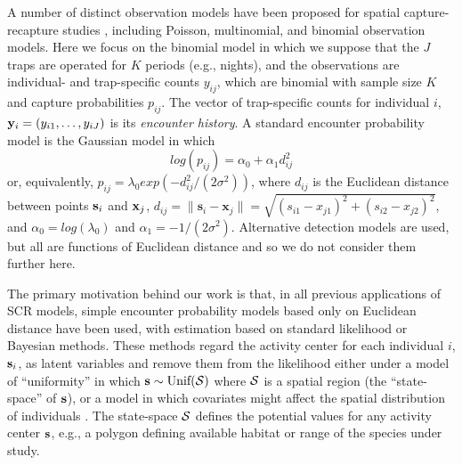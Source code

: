 \documentclass[12pt]{article}
\begin{document}
A number of distinct observation
models have been proposed for
spatial capture-recapture studies \citep{borchers_efford:2008,
  royle_etal:2009ecol, efford_etal:2009ecol}, including Poisson,
multinomial, and binomial observation models.
Here we focus on the binomial model in which we
suppose that the $J$ traps %
are operated for $K$ periods (e.g., nights), and
the observations are individual- and trap-specific counts $y_{ij}$,
which are binomial with sample size $K$ and capture
probabilities
$p_{ij}$. The vector of trap-specific counts for individual $i$,
 ${\bf y}_{i} = (y_{i1},\ldots,y_{iJ})$ is its {\it encounter history}.
A standard encounter probability model
\citep{borchers_efford:2008} is the Gaussian model in which
\begin{equation}
log(p_{ij})= \alpha_{0} + \alpha_{1} d_{ij}^{2}
\label{eq.encounter}
\end{equation}
or, equivalently,
$p_{ij} = \lambda_{0} exp(-d_{ij}^{2} /(2\sigma^{2}) )$,
where %
$d_{ij}$ is the Euclidean
distance between points ${\bf s}_{i}$ and ${\bf x}_{j}$,
$d_{ij} = \|\textbf{s}_i - \textbf{x}_j\| = \sqrt{(s_{i1}-x_{j1})^2 +
  (s_{i2}-x_{j2})^2}$,
and
 $\alpha_{0} = log(\lambda_{0})$ and $\alpha_{1} = -1/(2\sigma^2)$.
Alternative detection models are used, but all are
functions of Euclidean distance and so we do not consider them
further here.

The primary motivation behind our work is that, in all
previous applications of SCR models, simple encounter probability
models based only on  Euclidean distance
have been used, with estimation based on standard likelihood or
Bayesian methods. These
methods regard the activity center for each individual $i$, ${\bf s}_{i}$, as latent variables
and remove them from the likelihood either under a
model of ``uniformity'' in which ${\bf s} \sim \mbox{Unif}({\cal
  S})$ where ${\cal S}$ is a spatial region (the ``state-space'' of
${\bf s}$), or a
model in which covariates might affect the spatial distribution of
individuals \citep{borchers_efford:2008}. The state-space ${\cal S}$
defines the potential values for any activity center ${\bf s}$, e.g.,
a polygon defining available habitat or range of the species under study.
\end{document}
